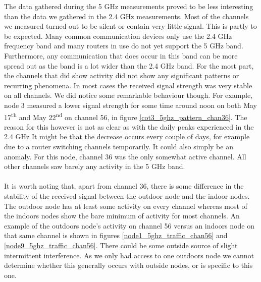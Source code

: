 \documentclass[a4paper, 11pt]{article}
\begin{document}
The data gathered during the 5 GHz measurements proved to be less interesting than the data we gathered in the 2.4 GHz measurements. Most of the channels we measured turned out to be silent or contain very little signal. This is partly to be expected. Many common communication devices only use the 2.4 GHz frequency band and many routers in use do not yet support the 5 GHz band. Furthermore, any communication that does occur in this band can be more spread out as the band is a lot wider than the 2.4 GHz band. For the most part, the channels that did show activity did not show any significant patterns or recurring phenomena. In most cases the received signal strength was very stable on all channels. We did notice some remarkable behaviour though. For example, node 3 measured a lower signal strength for some time around noon on both May 17\textsuperscript{th} and May 22\textsuperscript{nd} on channel 56, in figure \ref{cot3_5ghz_pattern_chan36}. The reason for this however is not as clear as with the daily peaks experienced in the 2.4 GHz It might be that the decrease occurs every couple of days, for example due to a router switching channels temporarily. It could also simply be an anomaly. For this node, channel 36 was the only somewhat active channel. All other channels saw barely any activity in the 5 GHz band. \\\\
It is worth noting that, apart from channel 36, there is some difference in the stability of the received signal between the outdoor node and the indoor nodes. The outdoor node has at least some activity on every channel whereas most of the indoors nodes show the bare minimum of activity for most channels. An example of the outdoors node's activity on channel 56 versus an indoors node on that same channel is shown in figures \ref{node1_5ghz_traffic_chan56} and \ref{node9_5ghz_traffic_chan56}. There could be some outside source of slight intermittent interference. As we only had access to one outdoors node we cannot determine whether this generally occurs with outside nodes, or is specific to this one.
\end{document}
